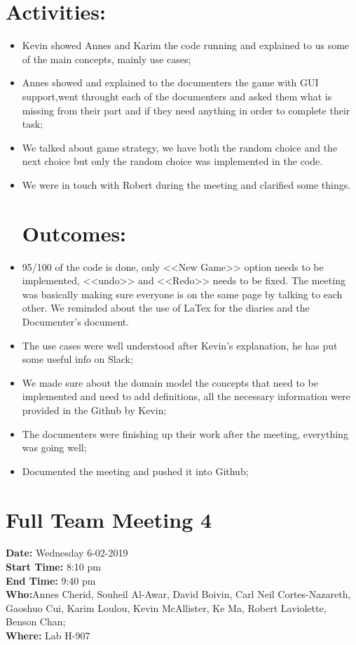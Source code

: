 \documentclass[12pt]{article}
\begin{document}
\section{Activities:} 
\begin{itemize}
\item Kevin showed Annes and Karim the code running and explained to us some of the main concepts, mainly use cases; 
\item Annes showed and explained to the documenters the game with GUI support,went throught each of the documenters and asked them what is missing from their part and if they need anything in order to complete their task;\\
\item We talked about game strategy, we have both the random choice and the next choice but only the random choice was implemented in the code.
\item We were in touch with Robert during the meeting and clarified some things.
\section{Outcomes:} 
\item  95/100 of the code is done, only <<New Game>> option needs to be implemented, <<undo>> and <<Redo>> needs to be fixed. The meeting was basically making sure everyone is on the same page by talking to each other. We reminded about the use of LaTex for the diaries and the Documenter’s document. 
\item The use cases were well understood after Kevin’s explanation, he has put some useful info on Slack;
\item We made sure about the domain model the concepts that need to be implemented and need to add definitions, all the necessary information were provided in the Github by Kevin;
\item The documenters were finishing up their work after the meeting, everything was going well;\\
 \item Documented the meeting and pushed it into Github;\\
\end {itemize}


\section {Full Team Meeting 4}
{\bf Date:} Wednesday 6-02-2019\\
{\bf Start Time:} 8:10 pm\\
{\bf End Time:} 9:40 pm \\
{\bf Who:}Annes Cherid, Souheil Al-Awar, David Boivin, Carl Neil Cortes-Nazareth, Gaoshuo Cui, Karim	Loulou, Kevin McAllister, Ke Ma, Robert Laviolette, Benson Chan;   \\
{\bf Where:} Lab H-907 \\
\end{document}

